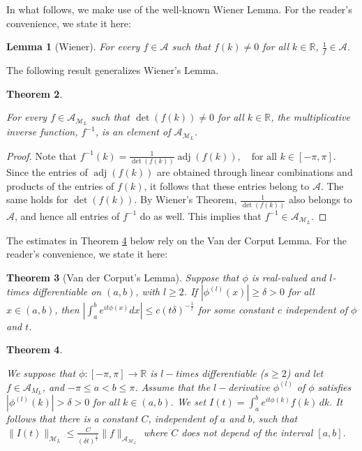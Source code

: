 \documentclass[12pt,oneside,onecolumn,open]{article}
\newtheorem{teo}{Theorem}[section]
\newtheorem{lema}[teo]{Lemma}
\begin{document}
In what follows, we make use of the well-known Wiener Lemma. For the reader's convenience, we state it here:
 
 \begin{lema}[Wiener] For every  $f\in \mathcal{A}$ such that $f(k)\neq 0$  for all $k \in \mathbb{R}$,  $\frac{1}{f}\in \mathcal{A}$.
 \end{lema} 
 
The following result generalizes Wiener's Lemma.
\begin{teo} 
\label{thm:wienerG}

For every  \(f \in \mathcal{A}_{\mathcal{M}_{L}}\)  such that \(\det(f(k)) \neq 0\) for all \(k \in \mathbb{R}\),  the multiplicative inverse function, \(f^{-1}\), is an element of \(\mathcal{A}_{\mathcal{M}_{L}}\).

\end{teo}

\begin{proof}
Note that  $ 
f^{-1}(k) = \frac{1}{\det(f(k))} \operatorname{adj}(f(k)), \quad \text{for all } k \in [-\pi, \pi].
$  
Since the entries of \(\operatorname{adj}(f(k))\) are obtained through linear combinations and products of the entries of \(f(k)\), it follows that these entries belong to \(\mathcal{A}\). The same holds for \(\det(f(k))\). By Wiener's Theorem, \(\frac{1}{\det(f(k))}\) also belongs to \(\mathcal{A}\), and hence all entries of \(f^{-1}\) do as well. This implies that \(f^{-1} \in \mathcal{A}_{\mathcal{M}_{L}}\).

\end{proof}



The estimates in Theorem \ref{VanderWiener} below rely on the Van der Corput Lemma. For the reader's convenience, we state it here:
\begin{teo}[Van der Corput's Lemma]\label{Vander} 
Suppose that $\phi$ is real-valued and $l$-times differentiable on $(a,b)$, with $l \geq 2$. If $|\phi^{(l)}(x)| \geq \delta > 0$ for all $x \in (a,b)$, then
$ 
\left|\int_{a}^{b} e^{it \phi(x)}  dx \right| \leq c (t \delta)^{-\frac{1}{l}}
$ 
for some constant $c$ independent of $\phi$ and $t$.
\end{teo}




\begin{teo}\label{VanderWiener}

We suppose that $ \phi : [-\pi, \pi ] \to \mathbb{R} $  is $l-$times differentiable 
($ s \geq 2$)
    and let \(f \in \mathcal{A}_{M_{L}}\), and \(-\pi \leq a < b \leq \pi\).  Assume that the $l-$derivative $\phi^{(l)}$  of $  \phi $ satisfies \(|\phi^{(l)}(k)| > \delta > 0\) for all \(k \in (a, b)\). We set $ 
I(t) = \int_{a}^{b} e^{it\phi(k)} f(k) \, dk .
$ 
It follows that there is a constant $C$, independent of $a$ and $b$,  such that  
$ 
\|I(t)\|_{\mathcal{M}_L} \leq \frac{C}{(\delta t)^{\frac{1}{l}}} \|f\|_{\mathcal{\mathcal{A}_{M_{L}}}}
$ 
where \(C\) does not depend of the interval \([a, b]\).
\label{teo:vanderG}
\end{teo}
\end{document}
